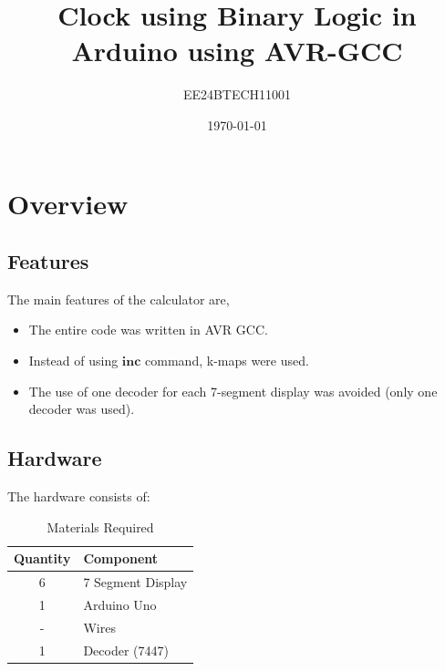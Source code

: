\documentclass[a4paper,12pt]{article}
\title{Clock using Binary Logic in Arduino using AVR-GCC}
\author{EE24BTECH11001}
\date{\today}
\begin{document}
\maketitle

\section*{Overview}
\subsection*{Features}
The main features of the calculator are,
\begin{itemize}
    \item The entire code was written in AVR GCC.
    \item Instead of using $\mathbf{inc}$ command, k-maps were used. 
    \item The use of one decoder for each 7-segment display was avoided (only one decoder was used).

\end{itemize}
\subsection*{Hardware}

The hardware consists of:
\begin{table}[H]
\centering
\begin{tabular}{|c|l|}
\hline
\textbf{Quantity} & \textbf{Component} \\
\hline
6 & 7 Segment Display \\
\hline
1 & Arduino Uno\\
\hline
- & Wires \\
\hline
1 & Decoder (7447) \\
\hline
\end{tabular}
\caption{Materials Required}
\label{tab:materials}
\end{table}
\end{document}
